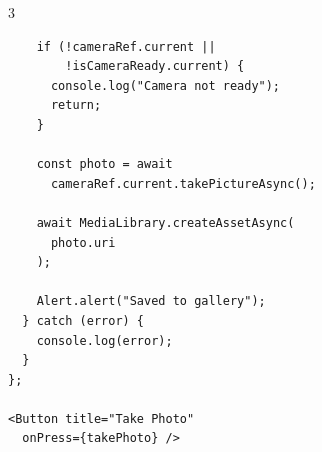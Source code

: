 \documentclass[8pt,a4paper]{extarticle}
\begin{document}
\begin{multicols}{3}
\begin{lstlisting}
    if (!cameraRef.current ||
        !isCameraReady.current) {
      console.log("Camera not ready");
      return;
    }

    const photo = await
      cameraRef.current.takePictureAsync();

    await MediaLibrary.createAssetAsync(
      photo.uri
    );

    Alert.alert("Saved to gallery");
  } catch (error) {
    console.log(error);
  }
};

<Button title="Take Photo"
  onPress={takePhoto} />
\end{lstlisting}

\end{multicols}
\end{document}
